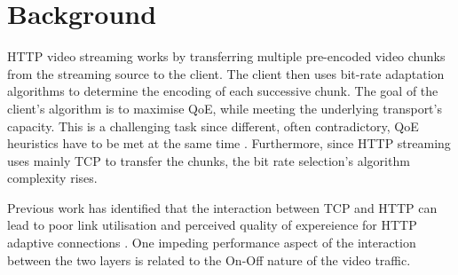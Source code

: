 \documentclass[10pt,sigconf]{acmart}
\begin{document}

\section{Background}
\label{sec:background}


HTTP video streaming works by transferring multiple pre-encoded video chunks from the streaming source to the client. The client then uses bit-rate adaptation algorithms to determine the encoding of each successive chunk. The goal of the client's algorithm is to maximise QoE, while meeting the underlying transport's capacity. This is a challenging task since different, often contradictory, QoE heuristics have to be met at the same time \cite{Seufert-2015-A-Survey-on-QoE-Dash}. Furthermore, since HTTP streaming uses mainly TCP to transfer the chunks, the bit rate selection's algorithm complexity rises.

Previous work has identified that the interaction between TCP and HTTP can lead to poor link utilisation and perceived quality of expereience for HTTP adaptive connections \cite{Bae-2015-why-is-http-streaming-hard,Esteban-2012-Interactions-HTTP-TCP}. One impeding performance aspect of the interaction between the two layers is related to the On-Off nature of the video traffic.
\end{document}
